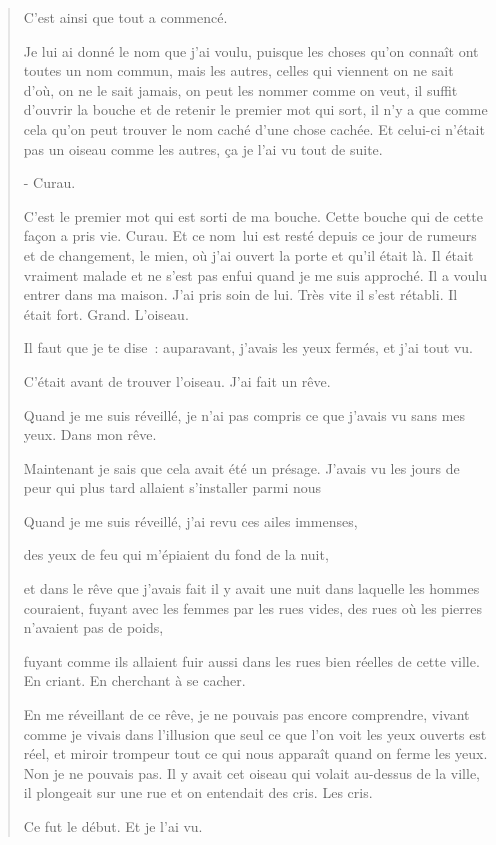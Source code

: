 \begin{quote}
C'est ainsi que tout a commencé.

Je lui ai donné le nom que j'ai voulu, puisque les choses qu'on connaît
ont toutes un nom commun, mais les autres, celles qui viennent on ne
sait d'où, on ne le sait jamais, on peut les nommer comme on veut, il
suffit d'ouvrir la bouche et de retenir le premier mot qui sort, il n'y
a que comme cela qu'on peut trouver le nom caché d'une chose cachée. Et
celui-ci n'était pas un oiseau comme les autres, ça je l'ai vu tout de
suite.

- Curau.

C'est le premier mot qui est sorti de ma bouche. Cette bouche qui de
cette façon a pris vie. Curau. Et ce nom~lui est resté depuis ce jour de
rumeurs et de changement, le mien, où j'ai ouvert la porte et qu'il
était là. Il était vraiment malade et ne s'est pas enfui quand je me
suis approché. Il a voulu entrer dans ma maison. J'ai pris soin de lui.
Très vite il s'est rétabli. Il était fort. Grand. L'oiseau.

Il faut que je te dise~: auparavant, j'avais les yeux fermés, et j'ai
tout vu.

C'était avant de trouver l'oiseau. J'ai fait un rêve.

Quand je me suis réveillé, je n'ai pas compris ce que j'avais vu sans
mes yeux. Dans mon rêve.

Maintenant je sais que cela avait été un présage. J'avais vu les jours
de peur qui plus tard allaient s'installer parmi nous

Quand je me suis réveillé, j'ai revu ces ailes immenses,

des yeux de feu qui m'épiaient du fond de la nuit,

et dans le rêve que j'avais fait il y avait une nuit dans laquelle les
hommes couraient, fuyant avec les femmes par les rues vides, des rues où
les pierres n'avaient pas de poids,

fuyant comme ils allaient fuir aussi dans les rues bien réelles de cette
ville. En criant. En cherchant à se cacher.

En me réveillant de ce rêve, je ne pouvais pas encore comprendre, vivant
comme je vivais dans l'illusion que seul ce que l'on voit les yeux
ouverts est réel, et miroir trompeur tout ce qui nous apparaît quand on
ferme les yeux. Non je ne pouvais pas. Il y avait cet oiseau qui volait
au-dessus de la ville, il plongeait sur une rue et on entendait des
cris. Les cris.

Ce fut le début. Et je l'ai vu.


\end{quote}
